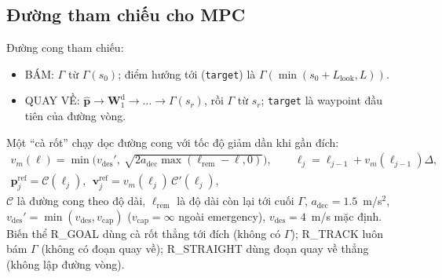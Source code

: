 \documentclass[11pt,a4paper]{article}
\numberwithin{equation}{section}
\newcommand{\vb}[1]{\bm{#1}}
\newcommand{\code}[1]{\texttt{\small #1}}
\theoremstyle{definition}
\theoremstyle{plain}
\theoremstyle{remark}
\begin{document}
\subsection{Đường tham chiếu cho MPC}
\label{sec:refcurve}
Đường cong tham chiếu:
\begin{itemize}
\item BÁM: $\Gamma$ từ $\Gamma(s_0)$; điểm hướng tới (\code{target}) là $\Gamma(\min(s_0+L_{\text{look}},L))$.
\item QUAY VỀ: $\hat{\vb p}\to\vb W^{\text{d}}_1\to\dots\to\Gamma(s_r)$, rồi $\Gamma$ từ $s_r$; \code{target} là waypoint đầu tiên của đường vòng.
\end{itemize}
Một ``cà rốt'' chạy dọc đường cong với tốc độ giảm dần khi gần đích:
\begin{gather}
v_m(\ell)=\min\Big(v_{\text{des}}',\ \sqrt{2a_{\text{dec}}\max(\ell_{\text{rem}}-\ell,0)}\Big),\qquad \ell_{j}=\ell_{j-1}+v_m(\ell_{j-1})\Delta,\nonumber\\
\vb p^{\text{ref}}_j=\mathcal C(\ell_j),\ \ \vb v^{\text{ref}}_j=v_m(\ell_j)\,\mathcal C'(\ell_j), \label{eq:carrot}
\end{gather}
$\mathcal C$ là đường cong theo độ dài, $\ell_{\text{rem}}$ là độ dài còn lại tới cuối $\Gamma$, $a_{\text{dec}}=1.5$~m/s$^2$, $v_{\text{des}}'=\min(v_{\text{des}},v_{\text{cap}})$ ($v_{\text{cap}}=\infty$ ngoài emergency), $v_{\text{des}}=4$~m/s mặc định. Biến thể R\_GOAL dùng cà rốt thẳng tới đích (không có $\Gamma$); R\_TRACK luôn bám $\Gamma$ (không có đoạn quay về); R\_STRAIGHT dùng đoạn quay về thẳng (không lập đường vòng).

\end{document}

